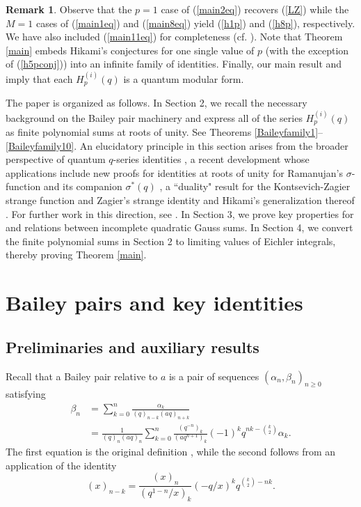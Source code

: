\documentclass[11pt,reqno]{amsart}
\theoremstyle{definition}
\newtheorem{remark}[theorem]{Remark}
\numberwithin{equation}{section}
\renewcommand{\=}{\;=\;}
\begin{document}
\begin{remark}
Observe that the $p=1$ case of (\ref{main2eq}) recovers (\ref{LZ}) while the $M=1$ cases of (\ref{main1eq}) and (\ref{main8eq}) yield (\ref{h1p}) and (\ref{h8p}), respectively. We have also included (\ref{main11eq}) for completeness (cf. \cite[(3.8), (3.10)]{hikami5}). Note that Theorem \ref{main} embeds Hikami's conjectures for one single value of $p$ (with the exception of (\ref{h5pconj})) into an infinite family of identities. Finally, our main result and \cite[Section 4.4]{go} imply that each $H_p^{(i)}(q)$ is a quantum modular form.
\end{remark}

The paper is organized as follows. In Section 2, we recall the necessary background on the Bailey pair machinery and express all of the series $H_p^{(i)}(q)$ as finite polynomial sums at roots of unity.  See Theorems \ref{Baileyfamily1}--\ref{Baileyfamily10}.   An elucidatory principle in this section arises from the broader perspective of quantum $q$-series identities \cite{love1, love2}, a recent development whose applications include new proofs for identities at roots of unity for Ramanujan's $\sigma$-function and its companion $\sigma^{*}(q)$ \cite{ADH, Cohen}, a ``duality" result for the Kontsevich-Zagier strange function \cite{bopr, fkvy} and Zagier's strange identity and Hikami's generalization thereof \cite{hikamiRAMA, z}. For further work in this direction, see \cite{dl, fm, f, ls}. In Section 3, we prove key properties for and relations between incomplete quadratic Gauss sums. In Section 4, we convert the finite polynomial sums in Section 2 to limiting values of Eichler integrals, thereby proving Theorem \ref{main}.

\section{Bailey pairs and key identities}

\subsection{Preliminaries and auxiliary results}

Recall that a Bailey pair relative to $a$ is a pair of sequences $(\alpha_n,\beta_n)_{n \geq 0}$ satisfying
\begin{align} 
\beta_n &= \sum_{k=0}^n \frac{\alpha_k}{(q)_{n-k}(aq)_{n+k}} \label{pairdef} \\
&= \frac{1}{(q)_n(aq)_n} \sum_{k=0}^n \frac{(q^{-n})_k}{(aq^{n+1})_k}(-1)^kq^{nk -\binom{k}{2}} \alpha_k. \label{pairdefbis}
\end{align}
The first equation is the original definition \cite{An1}, while the second follows from an application of the identity \cite[Appendix I, Eq. (I.10)]{Ga-Ra}
\begin{equation} \label{qPochn-k}
(x)_{n-k} = \frac{(x)_n}{(q^{1-n}/x)_k}(-q/x)^kq^{\binom{k}{2} - nk}.
\end{equation} 
\end{document}
